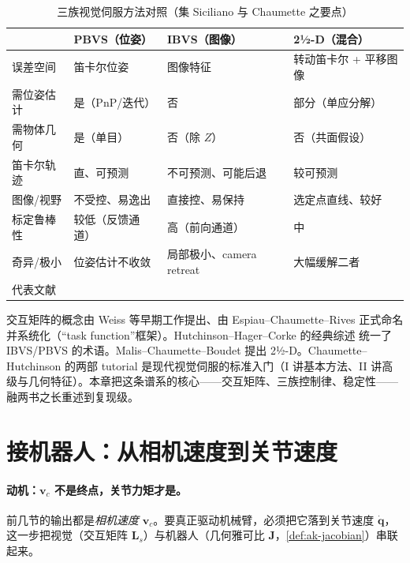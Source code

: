 \begin{table}[H]
\centering
\small
\caption{三族视觉伺服方法对照（集 Siciliano\cite{siciliano2009robotics} 与 Chaumette\cite{chaumette2006visual,chaumette2007visual} 之要点）}
\label{tab:vs-comparison}
\begin{tabular}{@{}llll@{}}
\toprule
 & \textbf{PBVS（位姿）} & \textbf{IBVS（图像）} & \textbf{2½-D（混合）}\\
\midrule
误差空间 & 笛卡尔位姿 & 图像特征 & 转动笛卡尔 + 平移图像\\
需位姿估计 & 是（PnP/迭代） & 否 & 部分（单应分解）\\
需物体几何 & 是（单目） & 否（除 $Z$） & 否（共面假设）\\
笛卡尔轨迹 & 直、可预测 & 不可预测、可能后退 & 较可预测\\
图像/视野 & 不受控、易逸出 & 直接控、易保持 & 选定点直线、较好\\
标定鲁棒性 & 较低（反馈通道） & 高（前向通道） & 中\\
奇异/极小 & 位姿估计不收敛 & 局部极小、camera retreat & 大幅缓解二者\\
代表文献 & \cite{siciliano2009robotics} & \cite{espiau1992new,hutchinson1996tutorial} & \cite{malis1999twohalf}\\
\bottomrule
\end{tabular}
\end{table}

\begin{note}[谱系：交互矩阵与三族方法的源流]\label{note:vs-lineage}
交互矩阵的概念由 Weiss 等早期工作提出、由 Espiau--Chaumette--Rives\cite{espiau1992new} 正式命名并系统化（“task function”框架）。Hutchinson--Hager--Corke 的经典综述\cite{hutchinson1996tutorial} 统一了 IBVS/PBVS 的术语。Malis--Chaumette--Boudet\cite{malis1999twohalf} 提出 2½-D。Chaumette--Hutchinson 的两部 tutorial\cite{chaumette2006visual,chaumette2007visual} 是现代视觉伺服的标准入门（I 讲基本方法、II 讲高级与几何特征）。本章把这条谱系的核心——交互矩阵、三族控制律、稳定性——融两书之长重述到复现级。
\end{note}

\section{接机器人：从相机速度到关节速度}
\label{sec:vs-robot}

\paragraph{动机：$\mathbf{v}_c$ 不是终点，关节力矩才是。}
前几节的输出都是\emph{相机速度} $\mathbf{v}_c$。要真正驱动机械臂，必须把它落到关节速度 $\dot{\mathbf{q}}$，这一步把视觉（交互矩阵 $\mathbf{L}_s$）与机器人（几何雅可比 $\mathbf{J}$，\cref{def:ak-jacobian}）串联起来。

